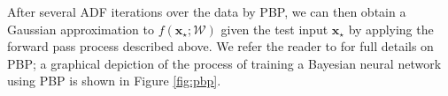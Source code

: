 After several ADF iterations over the data by PBP, we can then obtain a Gaussian approximation to $f(\mathbf{x}_\star;\mathcal{W})$ given the test input $\mathbf{x}_\star$ by applying the forward pass process described above. We refer the reader to \cite{hernandez2015probabilistic} for full details on PBP; a graphical depiction of the process of training a Bayesian neural network using PBP is shown in Figure \ref{fig:pbp}.

